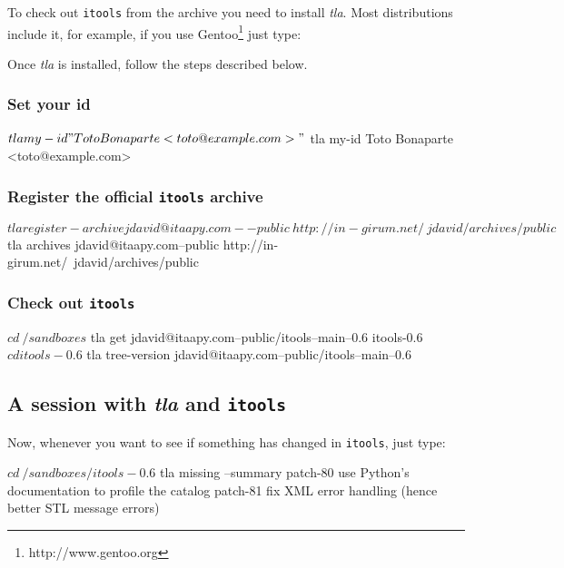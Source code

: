 To check out {\tt itools} from the archive you need to install {\em tla}.
Most distributions include it, for example, if you use
Gentoo\footnote{http://www.gentoo.org} just type:


Once {\em tla} is installed, follow the steps described below.


\subsubsection{Set your id}

\begin{code}
    $ tla my-id "Toto Bonaparte <toto@example.com>"
    $ tla my-id
    Toto Bonaparte <toto@example.com>
\end{code}


\subsubsection{Register the official {\tt itools} archive}

\begin{code}
    $ tla register-archive jdavid@itaapy.com--public \
          http://in-girum.net/~jdavid/archives/public
    $ tla archives
    jdavid@itaapy.com--public
        http://in-girum.net/~jdavid/archives/public
\end{code}


\subsubsection{Check out {\tt itools}}

\begin{code}
    $ cd ~/sandboxes
    $ tla get jdavid@itaapy.com--public/itools--main--0.6 itools-0.6
    $ cd itools-0.6
    $ tla tree-version
    jdavid@itaapy.com--public/itools--main--0.6
\end{code}

\subsection{A session with {\em tla} and {\tt itools}}

Now, whenever you want to see if something has changed in {\tt itools},
just type:

\begin{code}
    $ cd ~/sandboxes/itools-0.6
    $ tla missing --summary
    patch-80
        use Python's documentation to profile the catalog
    patch-81
        fix XML error handling (hence better STL message errors)
\end{code}

